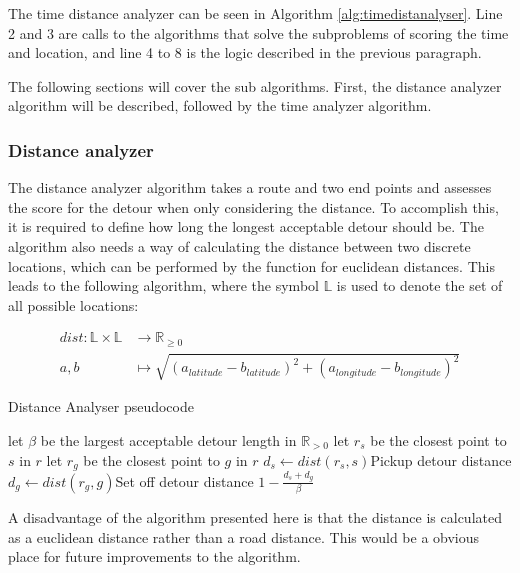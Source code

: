 The time distance analyzer can be seen in Algorithm \ref{alg:timedistanalyser}.
Line 2 and 3 are calls to the algorithms that solve the subproblems of scoring the time and location, and line 4 to 8 is the logic described in the previous paragraph.

The following sections will cover the sub algorithms.
First, the distance analyzer algorithm will be described, followed by the time analyzer algorithm.

\subsubsection{Distance analyzer}
The distance analyzer algorithm takes a route and two end points and assesses the score for the detour when only considering the distance.
To accomplish this, it is required to define how long the longest acceptable detour should be.
The algorithm also needs a way of calculating the distance between two discrete locations, which can be performed by the function for euclidean distances.
This leads to the following algorithm, where the symbol $\mathbb{L}$ is used to denote the set of all possible locations:

\begin{align*}
	dist : \mathbb{L}\times\mathbb{L} &\rightarrow \mathbb{R}_{\geq 0}\\
	a, b &\mapsto \sqrt{(a_{latitude} - b_{latitude})^2 + (a_{longitude} - b_{longitude})^2}
\end{align*}

\begin{algorithm}
	\caption{Distance Analyser pseudocode}
	\label{alg:distanalyser}
	\begin{algorithmic}[1]
		\Require 
		\Statex let $\beta$ be the largest acceptable detour length in $\mathbb{R}_{>0}$ 
		\Statex 
			\State let $r_s$ be the closest point to $s$ in $r$
			\State let $r_g$ be the closest point to $g$ in $r$
			\State $d_s\gets dist(r_s, s)$\Comment Pickup detour distance
			\State $d_g\gets dist(r_g, g)$\Comment Set off detour distance
			\State\Return $1-\frac{d_s + d_g}{\beta}$
		\EndFunction
	\end{algorithmic}
\end{algorithm}

A disadvantage of the algorithm presented here is that the distance is calculated as a euclidean distance rather than a road distance. 
This would be a obvious place for future improvements to the algorithm.

